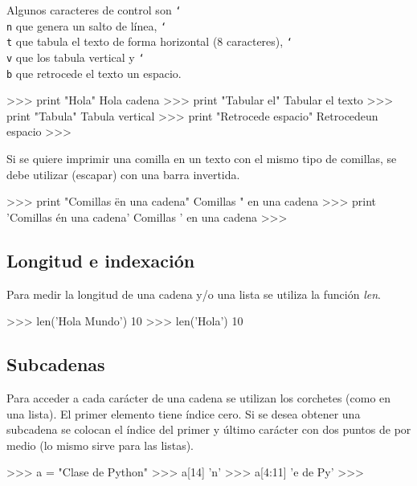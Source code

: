 Algunos caracteres de control son {\tt\char`\\n} que genera un salto de línea, {\tt\char`\\t} que tabula el texto de forma horizontal (8 caracteres), {\tt\char`\\v} que los tabula vertical y {\tt\char`\\b} que retrocede el texto un espacio.\\

\begin{pyglist} [language=python]
>>> print "Hola\ncadena"
Hola
cadena
>>> print "Tabular el\ttexto"
Tabular el	texto
>>> print "Tabula\vvertical"
Tabula
      vertical
>>> print "Retrocede \bun espacio"
Retrocedeun espacio
>>> 
\end{pyglist}

Si se quiere imprimir una comilla en un texto con el mismo tipo de comillas, se debe utilizar (escapar) con una barra invertida.\\

\begin{pyglist} [language=python]
>>> print "Comillas \" en una cadena"
Comillas " en una cadena
>>> print 'Comillas \' en una cadena'
Comillas ' en una cadena
>>>
\end{pyglist}

\subsection{Longitud e indexación}

Para medir la longitud de una cadena y/o una lista se utiliza la función \textit{len}.\\

\begin{pyglist} [language=python]
>>> len('Hola Mundo')
10
>>> len('Hola\nMundo')
10
\end{pyglist}

\subsection{Subcadenas}

Para acceder a cada carácter de una cadena se utilizan los corchetes (como en una lista). El primer elemento tiene índice cero. Si se desea obtener una subcadena se colocan el índice del primer y último carácter con dos puntos de por medio (lo mismo sirve para las listas).\\

\begin{pyglist} [language=python]
>>> a = "Clase de Python"
>>> a[14]
'n'
>>> a[4:11]
'e de Py'
>>> 
\end{pyglist}

